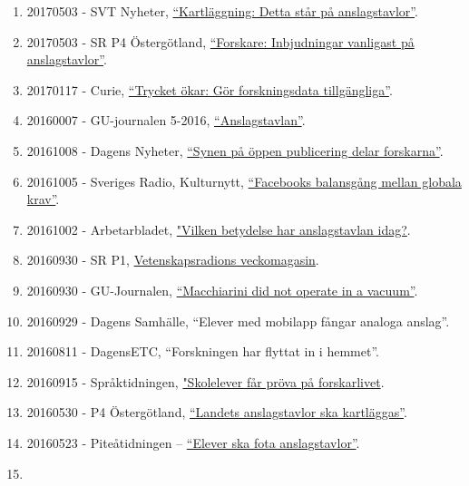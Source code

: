 \documentclass[
]{article}
\begin{document}
\begin{enumerate}
{  kartlägger porrbotarna på Twitter''}.
\item
  20170503 - SVT Nyheter,
  \href{https://www.svt.se/nyheter/lokalt/vast/elever-har-kartlagt-anslagstavlor-i-hela-landet}{``Kartläggning:
  Detta står på anslagstavlor''}.
\item
  20170503 - SR P4 Östergötland,
  \href{http://t.sr.se/2pdhEBb}{``Forskare: Inbjudningar vanligast på
  anslagstavlor''}.
\item
  20170117 - Curie,
  \href{http://www.tidningencurie.se/nyheter/2017/01/17/trycket-okar-gor-forskningsdata-tillgangliga/}{``Trycket
  ökar: Gör forskningsdata tillgängliga''}.
\item
  20160007 - GU-journalen 5-2016,
  \href{https://issuu.com/universityofgothenburg/docs/gu-journalen5-2016/34}{``Anslagstavlan''}.
\item
  20161008 - Dagens Nyheter,
  \href{http://www.dn.se/nyheter/sverige/synen-pa-oppen-publicering-delar-forskarna/}{``Synen
  på öppen publicering delar forskarna''}.
\item
  20161005 - Sveriges Radio, Kulturnytt,
  \href{http://sverigesradio.se/sida/artikel.aspx?programid=478\&artikel=6533649}{``Facebooks
  balansgång mellan globala krav''}.
\item
  20161002 - Arbetarbladet,
  \href{http://www.arbetarbladet.se/gavleborg/sandviken/vilken-betydelse-har-anslagstavlan-i-dag}{"Vilken
  betydelse har anslagstavlan idag?}.
\item
  20160930 - SR P1, \href{http://t.sr.se/2dszL0a}{Vetenskapsradions
  veckomagasin}.
\item
  20160930 - GU-Journalen,
  \href{https://issuu.com/universityofgothenburg/docs/guj4-2016}{``Macchiarini
  did not operate in a vacuum''}.
\item
  20160929 - Dagens Samhälle, ``Elever med mobilapp fångar analoga
  anslag''.
\item
  20160811 - DagensETC, ``Forskningen har flyttat in i hemmet''.
\item
  20160915 - Språktidningen,
  \href{http://spraktidningen.se/blogg/skolelever-far-prova-pa-forskarlivet}{"Skolelever
  får pröva på forskarlivet}.
\item
  20160530 - P4 Östergötland, \href{http://t.sr.se/1NY9nMZ}{``Landets
  anslagstavlor ska kartläggas''}.
\item
  20160523 - Piteåtidningen --
  \href{http://www.pt.se/nyheter/pitea/elever-ska-fota-anslagstavlor-10045575.aspx}{``Elever
  ska fota anslagstavlor''}.
\item

\end{enumerate}
\end{document}
